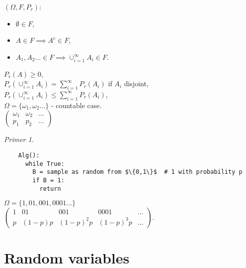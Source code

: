 \documentclass[a4paper, 12pt]{book}
\theoremstyle{definition}
\theoremstyle{remark}
\newtheorem*{ex}{Primer}
\begin{document}
$(\Omega, F, P_r)$:
\begin{itemize}[label=$\circ$]
  \item $\emptyset \in F$,
  \item $A \in F \implies A^c \in F$,
  \item $A_1, A_2 \dots \in F \implies \cup_{i=1}^{\infty} A_i \in F$.
\end{itemize}
$P_r(A) \geq 0$, \\
$P_r\left(\cup_{i=1}^{\infty} A_i\right) = \sum_{i=1}^{\infty} P_r(A_i)$ if $A_i$ disjoint, \\
$P_r\left(\cup_{i=1}^{\infty} A_i\right) \leq \sum_{i=1}^{\infty} P_r(A_i)$, \\
$\Omega = \{\omega_1, \omega_2 \dots\}$ - countable case. \\
$\begin{pmatrix}
  \omega_1 & \omega_2 & \dots \\
  p_1 & p_2 & \dots
\end{pmatrix}$
\begin{ex} \text{}
  \begin{lstlisting}
    Alg():
      while True:
        B = sample as random from $\{0,1\}$  # 1 with probability p
        if B = 1:
          return
  \end{lstlisting}
  $\Omega = \{1, 01, 001, 0001 \dots\}$ \\
  $\begin{pmatrix}
    1 & 01 & 001 & 0001 & \dots \\
    p & (1-p)p & (1-p)^2 p & (1-p)^3p & \dots
  \end{pmatrix}$.
\end{ex}


\section{Random variables}
\end{document}
